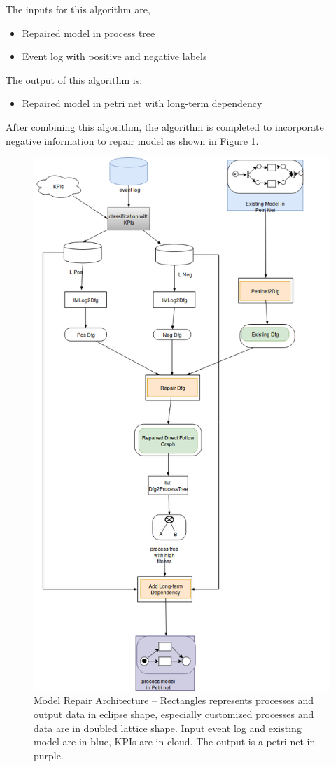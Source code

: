 \documentclass[]{article}
\begin{document}
The inputs for this algorithm are,
\begin{itemize}
	\item Repaired model in process tree
	\item Event log with positive and negative labels
\end{itemize}
The output of this algorithm is: 
\begin{itemize}
	\item Repaired model in petri net with long-term dependency
\end{itemize}
After combining this algorithm, the algorithm is completed to incorporate negative information to repair model as shown in Figure \ref{fig:architecture}.
\begin{figure}
	\includegraphics[width=\textwidth, height=\textheight]{FD_architecture_detail_02.png}
	\caption[Model Repair Architecture]{Model Repair Architecture -- \small Rectangles represents processes and output data in eclipse shape, especially customized processes and data are in doubled lattice shape. Input event log and existing model are in blue, KPIs are in cloud. The output is a petri net in purple. }
	\label{fig:architecture}
\end{figure}
\end{document}
